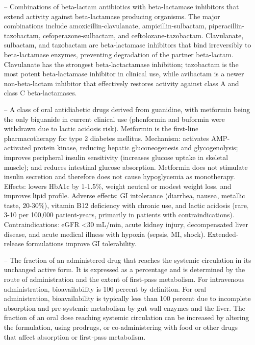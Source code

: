 -- Combinations of beta-lactam antibiotics with beta-lactamase inhibitors that extend activity against beta-lactamase producing organisms. The major combinations include amoxicillin-clavulanate, ampicillin-sulbactam, piperacillin-tazobactam, cefoperazone-sulbactam, and ceftolozane-tazobactam. Clavulanate, sulbactam, and tazobactam are beta-lactamase inhibitors that bind irreversibly to beta-lactamase enzymes, preventing degradation of the partner beta-lactam. Clavulanate has the strongest beta-lactactamase inhibition; tazobactam is the most potent beta-lactamase inhibitor in clinical use, while avibactam is a newer non-beta-lactam inhibitor that effectively restores activity against class A and class C beta-lactamases.

-- A class of oral antidiabetic drugs derived from guanidine, with metformin being the only biguanide in current clinical use (phenformin and buformin were withdrawn due to lactic acidosis risk). Metformin is the first-line pharmacotherapy for type 2 diabetes mellitus. Mechanism: activates AMP-activated protein kinase, reducing hepatic gluconeogenesis and glycogenolysis; improves peripheral insulin sensitivity (increases glucose uptake in skeletal muscle); and reduces intestinal glucose absorption. Metformin does not stimulate insulin secretion and therefore does not cause hypoglycemia as monotherapy. Effects: lowers HbA1c by 1-1.5\%, weight neutral or modest weight loss, and improves lipid profile. Adverse effects: GI intolerance (diarrhea, nausea, metallic taste, 20-30\%), vitamin B12 deficiency with chronic use, and lactic acidosis (rare, 3-10 per 100,000 patient-years, primarily in patients with contraindications). Contraindications: eGFR <30 mL/min, acute kidney injury, decompensated liver disease, and acute medical illness with hypoxia (sepsis, MI, shock). Extended-release formulations improve GI tolerability.

-- The fraction of an administered drug that reaches the systemic circulation in its unchanged active form. It is expressed as a percentage and is determined by the route of administration and the extent of first-pass metabolism. For intravenous administration, bioavailability is 100 percent by definition. For oral administration, bioavailability is typically less than 100 percent due to incomplete absorption and pre-systemic metabolism by gut wall enzymes and the liver. The fraction of an oral dose reaching systemic circulation can be increased by altering the formulation, using prodrugs, or co-administering with food or other drugs that affect absorption or first-pass metabolism.

